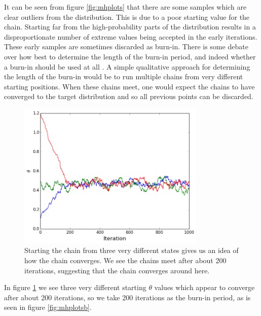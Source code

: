 \documentclass[a4paper,11pt,twoside]{article}
\begin{document}
It can be seen from figure \ref{fig:mhplots} that there are some samples which are clear
outliers from the distribution. This is due to a poor starting value for the
chain. Starting far from the high-probability parts of the distribution results
in a disproportionate number of extreme values being accepted in the early
iterations. These early samples are sometimes discarded as burn-in. There is
some debate over how best to determine the length of the burn-in period, and
indeed whether a burn-in should be used at all \cite{handbook}.
A simple qualitative approach for determining the length of the burn-in 
would be to run multiple chains from very different starting
positions. When these chains meet, one would expect the chains to have
converged to the target distribution and so all previous points can be
discarded. 
\begin{figure}[htb]
	\centering
	\includegraphics[width=0.8\textwidth]{convergence.png}
	\caption{Starting the chain from three very different states gives us
	an idea of how the chain converges. We see the chains meet after
	about 200 iterations, suggesting that the chain converges around here.}
	\label{fig:convergence}
\end{figure}
In figure \ref{fig:convergence} we see three very different starting $\theta$
values which appear to converge after about 200 iterations, so we take 200
iterations as the burn-in period, as is seen in figure \ref{fig:mhplotsb}.
\end{document}
